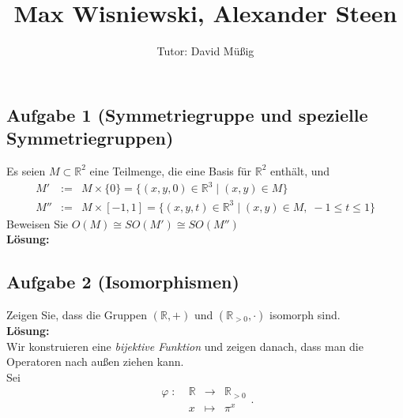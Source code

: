\documentclass[11pt,a4paper,ngerman]{article}
\author{Tutor: David Müßig}
\date{}
\title{Max Wisniewski, Alexander Steen}
\newcommand{\R}{\mathbb{R}}
\begin{document}

\maketitle
\thispagestyle{fancy}


\subsection*{Aufgabe 1 \mdseries (Symmetriegruppe und spezielle Symmetriegruppen)}

Es seien $M \subset \mathbb{R}^2$ eine Teilmenge, die eine Basis für $\mathbb{R}^2$ enthält, und
$$
\begin{array}{rcl}
M' & := & M \times \{ 0 \} = \{ (x,y,0) \in \R^3 \; | \; (x,y) \in M \}\\
M'' & := & M \times [-1 , 1] = \{ (x,y,t) \in \R^3 \; | \; (x,y) \in M, \; -1 \leq t \leq 1 \}
\end{array}
$$
Beweisen Sie $O(M) \cong SO(M') \cong SO(M'')$\\

\textbf{Lösung:}\\


\subsection*{Aufgabe 2 \mdseries (Isomorphismen)}

Zeigen Sie, dass die Gruppen $(\R,+)$ und $(\R_{>0},\cdot)$ isomorph sind.\\

\textbf{Lösung:}\\
Wir konstruieren eine \emph{bijektive Funktion} und zeigen danach, dass man die Operatoren nach außen ziehen kann.\\
Sei 
$$
\begin{array}{lrcl}
\varphi \; : \; & \R & \longrightarrow & \R_{>0}\\
& x & \longmapsto & \pi^x
\end{array}.
$$
\end{document}
